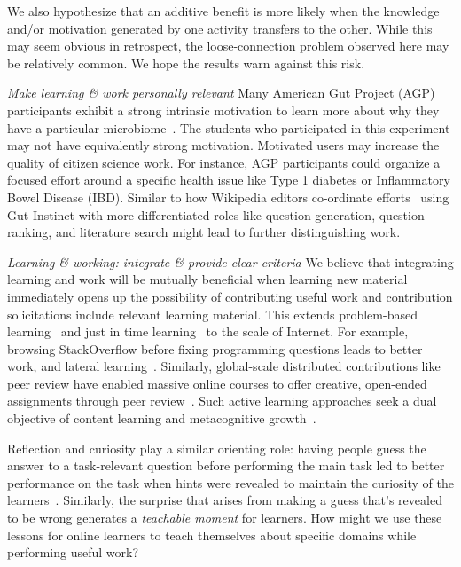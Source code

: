 We also hypothesize that an additive benefit is more likely when the knowledge and/or motivation generated by one activity transfers to the other. While this may seem obvious in retrospect, the loose-connection problem observed here may be relatively common. We hope the results warn against this risk.

\textit{Make learning \& work personally relevant}
Many American Gut Project (AGP) participants exhibit a strong intrinsic motivation to learn more about why they have a particular microbiome~\cite{Debelius2016}. The students who participated in this experiment may not have equivalently strong motivation. Motivated users may increase the quality of citizen science work. For instance, AGP participants could organize a focused effort around a specific health issue like Type 1 diabetes or Inflammatory Bowel Disease (IBD). Similar to how Wikipedia editors co-ordinate efforts~\cite{Krieger2009} using Gut Instinct with more differentiated roles like question generation, question ranking, and literature search might lead to further distinguishing work.

\textit{Learning \& working: integrate \& provide clear criteria}
We believe that integrating learning and work will be mutually beneficial when learning new material immediately opens up the possibility of contributing useful work and contribution solicitations include relevant learning material. This extends problem-based learning~\cite{Savery1995} and just in time learning~\cite{Bolton1999} to the scale of Internet. For example, browsing StackOverflow before fixing programming questions leads to better work, and lateral learning~\cite{Mamykina2011}. Similarly, global-scale distributed contributions like peer review have enabled massive online courses to offer creative, open-ended assignments through peer review~\cite{Kulkarni2013peer}. Such active learning approaches seek a dual objective of content learning and metacognitive growth~\cite{Crouch2001}.
 
Reflection and curiosity play a similar orienting role: having people guess the answer to a task-relevant question before performing the main task led to better performance on the task when hints were revealed to maintain the curiosity of the learners~\cite{Aleven2006, Law2016a}. Similarly, the surprise that arises from making a guess that’s revealed to be wrong generates a \textit{teachable moment} for learners. How might we use these lessons for online learners to teach themselves about specific domains while performing useful work? 

